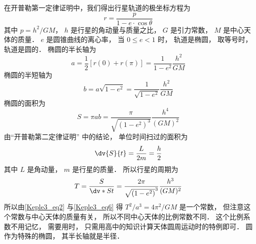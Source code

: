 

在开普勒第一定律证明中，我们得出行星轨道的极坐标方程为
\begin{equation}\label{Keple3_eq1}
  r = \frac{p}{1 - e \cdot \cos \theta }
\end{equation}
其中 $p = {h^2}/{GM}$，  $h$ 是行星的角动量与质量之比， $G$ 是引力常数， $M$ 是中心天体的质量． $e$ 是圆锥曲线的离心率， 当 $0 \le e < 1$ 时， 轨道是椭圆， 取等号时， 轨道是圆的． 椭圆的半长轴为
\begin{equation}\label{Keple3_eq2}
  a = \frac{1}{2}[r(0) + r(\pi)] = \frac{1}{1 - {e^2}}\frac{h^2}{GM}
\end{equation}
椭圆的半短轴为
\begin{equation}\label{Keple3_eq3}
  b = a\sqrt {1 - {e^2}}  = \frac{1}{\sqrt {1 - {e^2}} }\frac{h^2}{GM}
\end{equation}
椭圆的面积为
\begin{equation}\label{Keple3_eq4}
  S = \pi ab = \frac{\pi }{\sqrt{(1 - e^2)^3} }\frac{h^4}{(GM)^2}
\end{equation}
由“开普勒第二定律证明” 中的结论， 单位时间扫过的面积为
\begin{equation}\label{Keple3_eq5}
\dv{S}{t} = \frac{L}{2m} = \frac{h}{2}
\end{equation}
其中 $L$ 是角动量， $m$ 是行星的质量． 所以行星的周期为
\begin{equation}\label{Keple3_eq6}
  T = \frac{S}{\dv*{S}{t}} = \frac{2\pi}{\sqrt{(1 - e^2)}^3}\frac{h^3}{(GM)^2}
\end{equation}
所以由\autoref{Keple3_eq2} 与\autoref{Keple3_eq6} 得 $T^2/a^3 = 4\pi ^2/GM$ 是一个常数， 但注意这个常数与中心天体的质量有关， 所以不同中心天体的比例常数不同． 这个比例系数不用记忆， 需要用时， 只需用高中的知识计算天体圆周运动时的特例即可． 圆作为特殊的椭圆， 其半长轴就是半径．
